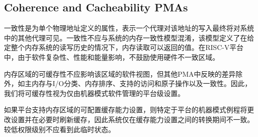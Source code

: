 {\subsection{Coherence and Cacheability PMAs}

\iffalse
Coherence is a property defined for a single physical address, and
indicates that writes to that address by one agent will eventually be
made visible to other agents in the system.  Coherence is not to be
confused with the memory consistency model of a system, which defines
what values a memory read can return given the previous history of
reads and writes to the entire memory system.  In RISC-V platforms,
the use of hardware-incoherent regions is discouraged due to software
complexity, performance, and energy impacts.
\fi
一致性是为单个物理地址定义的属性，表示一个代理对该地址的写入最终将对系统中的其他代理可见。一致性不应与系统的内存一致性模型混淆，该模型定义了在给定整个内存系统的读写历史的情况下，内存读取可以返回的值。在RISC-V平台中，由于软件复杂性、性能和能量影响，不鼓励使用硬件不一致区域。

\iffalse
The cacheability of a memory region should not affect the software
view of the region except for differences reflected in other PMAs,
such as main memory versus I/O classification, memory ordering,
supported accesses and atomic operations, and coherence.  For this
reason, we treat cacheability as a platform-level setting managed by
machine-mode software only.
\fi
内存区域的可缓存性不应影响该区域的软件视图，但其他PMA中反映的差异除外，如主内存与I/O分类、内存排序、支持的访问和原子操作以及一致性。因此，我们将可缓存性视为仅由机器模式软件管理的平台级设置。

\iffalse
Where a platform supports configurable cacheability settings for a
memory region, a platform-specific machine-mode routine will change
the settings and flush caches if necessary, so the system is only
incoherent during the transition between cacheability settings.  This
transitory state should not be visible to lower privilege levels.
\fi
如果平台支持内存区域的可配置缓存能力设置，则特定于平台的机器模式例程将更改设置并在必要时刷新缓存，因此系统仅在缓存能力设置之间的转换期间不一致。较低权限级别不应看到此临时状态。

}
